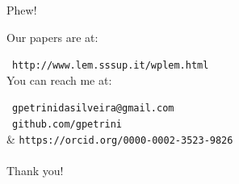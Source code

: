 \documentclass[bigger,aspectratio=169]{beamer}
\begin{document}
\begin{frame}[label={sec:org202b0a3}]{Phew!}

Our papers are at:

\faNewspaper\ \texttt{http://www.lem.sssup.it/wplem.html}\\

You can reach me at:

\faEnvelope\ \texttt{gpetrinidasilveira@gmail.com} \\
\faGithub\ \texttt{github.com/gpetrini} \\
\faOrcid & \texttt{https://orcid.org/0000-0002-3523-9826} \\

\\\Huge{Thank you!}
\end{frame}
\end{document}
